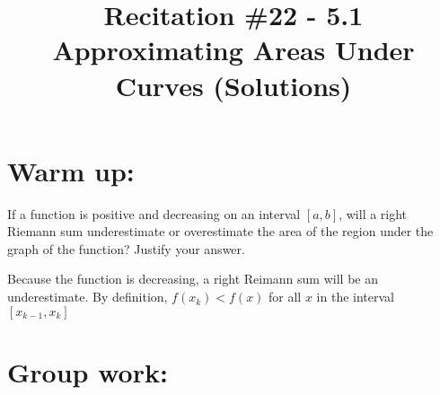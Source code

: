 \documentclass[nooutcomes]{ximera}
\title{Recitation \#22 - 5.1 Approximating Areas Under Curves (Solutions)}
\begin{document}
\begin{abstract}		\end{abstract}
\maketitle

\section*{Warm up:} 
If a function is positive and decreasing on an interval $[a,b]$, will a right Riemann sum underestimate or overestimate the area of the region under the graph of the function? Justify your answer.
		\begin{freeResponse}
		Because the function is decreasing, a right Reimann sum will be an underestimate.  By definition, $f(x_k)< f(x)$ for all $x$ in the interval $[x_{k-1},x_k]$ 
		\end{freeResponse}	
		
		
		

	
	
	
	
	

\section*{Group work:}
\end{document}
